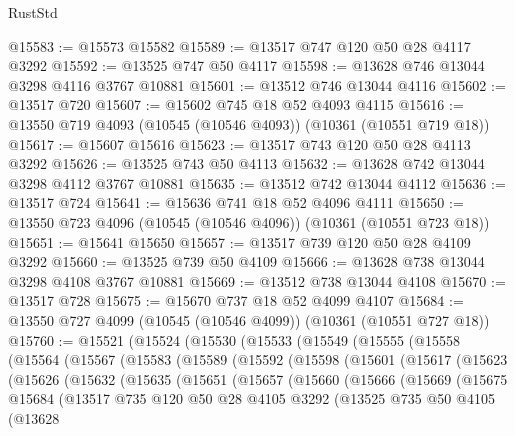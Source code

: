\begin{lexlean}{RustStd}
\begin{coremodule}
@15583 := @15573 @15582
@15589 := @13517 @747 @120 @50 @28 @4117 @3292
@15592 := @13525 @747 @50 @4117
@15598 := @13628 @746 @13044 @3298 @4116 @3767 @10881
@15601 := @13512 @746 @13044 @4116
@15602 := @13517 @720
@15607 := @15602 @745 @18 @52 @4093 @4115
@15616 := @13550 @719 @4093 (@10545 (@10546 @4093)) (@10361 (@10551 @719 @18))
@15617 := @15607 @15616
@15623 := @13517 @743 @120 @50 @28 @4113 @3292
@15626 := @13525 @743 @50 @4113
@15632 := @13628 @742 @13044 @3298 @4112 @3767 @10881
@15635 := @13512 @742 @13044 @4112
@15636 := @13517 @724
@15641 := @15636 @741 @18 @52 @4096 @4111
@15650 := @13550 @723 @4096 (@10545 (@10546 @4096)) (@10361 (@10551 @723 @18))
@15651 := @15641 @15650
@15657 := @13517 @739 @120 @50 @28 @4109 @3292
@15660 := @13525 @739 @50 @4109
@15666 := @13628 @738 @13044 @3298 @4108 @3767 @10881
@15669 := @13512 @738 @13044 @4108
@15670 := @13517 @728
@15675 := @15670 @737 @18 @52 @4099 @4107
@15684 := @13550 @727 @4099 (@10545 (@10546 @4099)) (@10361 (@10551 @727 @18))
@15760 := @15521
    (@15524
      (@15530
        (@15533
          (@15549
            (@15555
              (@15558
                (@15564
                  (@15567
                    (@15583
                      (@15589
                        (@15592
                          (@15598
                            (@15601
                              (@15617
                                (@15623
                                  (@15626
                                    (@15632
                                      (@15635
                                        (@15651
                                          (@15657
                                            (@15660
                                              (@15666
                                                (@15669
                                                  (@15675
                                                    @15684
                                                    (@13517
                                                      @735
                                                      @120
                                                      @50
                                                      @28
                                                      @4105
                                                      @3292
                                                      (@13525
                                                        @735
                                                        @50
                                                        @4105
                                                        (@13628

\end{coremodule}
\end{lexlean}
